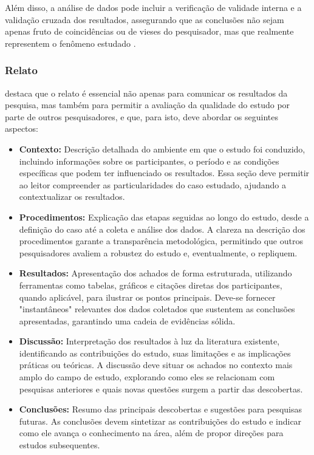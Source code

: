 Além disso, a análise de dados pode incluir a verificação de validade interna e a validação cruzada dos resultados, assegurando que as conclusões não sejam apenas fruto de coincidências ou de vieses do pesquisador, mas que realmente representem o fenômeno estudado \cite{yin_case_study_2009}.

\subsubsection{Relato}

 destaca que o relato é essencial não apenas para comunicar os resultados da pesquisa, mas também para permitir a avaliação da qualidade do estudo por parte de outros pesquisadores, e que, para isto, deve abordar os seguintes aspectos:

\begin{itemize}
\item \textbf{Contexto:} Descrição detalhada do ambiente em que o estudo foi conduzido, incluindo informações sobre os participantes, o período e as condições específicas que podem ter influenciado os resultados. Essa seção deve permitir ao leitor compreender as particularidades do caso estudado, ajudando a contextualizar os resultados.

\item \textbf{Procedimentos:} Explicação das etapas seguidas ao longo do estudo, desde a definição do caso até a coleta e análise dos dados. A clareza na descrição dos procedimentos garante a transparência metodológica, permitindo que outros pesquisadores avaliem a robustez do estudo e, eventualmente, o repliquem.

\item \textbf{Resultados:} Apresentação dos achados de forma estruturada, utilizando ferramentas como tabelas, gráficos e citações diretas dos participantes, quando aplicável, para ilustrar os pontos principais. Deve-se fornecer "instantâneos" relevantes dos dados coletados que sustentem as conclusões apresentadas, garantindo uma cadeia de evidências sólida.

\item \textbf{Discussão:} Interpretação dos resultados à luz da literatura existente, identificando as contribuições do estudo, suas limitações e as implicações práticas ou teóricas. A discussão deve situar os achados no contexto mais amplo do campo de estudo, explorando como eles se relacionam com pesquisas anteriores e quais novas questões surgem a partir das descobertas.

\item \textbf{Conclusões:} Resumo das principais descobertas e sugestões para pesquisas futuras. As conclusões devem sintetizar as contribuições do estudo e indicar como ele avança o conhecimento na área, além de propor direções para estudos subsequentes.
\end{itemize}

